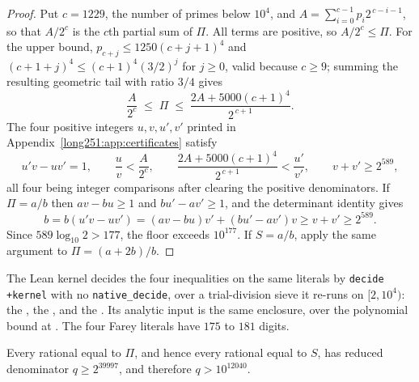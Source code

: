 \begin{proof}
Put $c=1229$, the number of primes below $10^4$, and
$A=\sum_{i=0}^{c-1}p_i2^{\,c-i-1}$, so that $A/2^{c}$ is the $c$th partial sum
of $\Pi$.  All terms are positive, so $A/2^{c}\le\Pi$.  For the upper bound,
$p_{c+j}\le1250(c+j+1)^4$ and $(c+1+j)^4\le(c+1)^4(3/2)^{j}$ for $j\ge0$, valid
because $c\ge9$; summing the resulting geometric tail with ratio $3/4$ gives
\[
 \frac{A}{2^{c}}\;\le\;\Pi\;\le\;\frac{2A+5000(c+1)^4}{2^{\,c+1}} .
\]
The four positive integers $u,v,u',v'$ printed in
Appendix~\ref{long251:app:certificates} satisfy
\[
 u'v-uv'=1,\qquad
 \frac uv<\frac{A}{2^{c}},\qquad
 \frac{2A+5000(c+1)^4}{2^{\,c+1}}<\frac{u'}{v'},\qquad
 v+v'\ge2^{589},
\]
all four being integer comparisons after clearing the positive denominators.
If $\Pi=a/b$ then $av-bu\ge1$ and $bu'-av'\ge1$, and the determinant identity
gives
\[
 b=b(u'v-uv')=(av-bu)v'+(bu'-av')v\ge v+v' \ge 2^{589}.
\]
Since $589\log_{10}2>177$, the floor exceeds $10^{177}$.  If $S=a/b$, apply the
same argument to $\Pi=(a+2b)/b$.
\end{proof}

\noindent The Lean kernel decides the four inequalities on the same literals by
\texttt{decide +kernel} with no \texttt{native\_decide}, over a trial-division
sieve it re-runs on $[2,10^4)$: the
,
the
, and the
.  Its analytic input is the same enclosure, over the
polynomial bound at
.
The four Farey literals have $175$ to $181$ digits.

\begin{theorem}\label{long251:res:cfexclusion}
Every rational equal to $\Pi$, and hence every rational equal to $S$, has
reduced denominator $q\ge2^{39997}$, and therefore $q>10^{12040}$.
\end{theorem}

